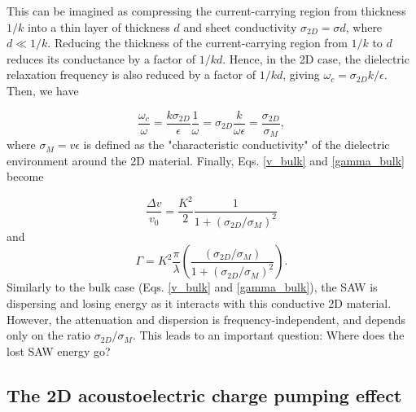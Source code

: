 \documentclass[double,12pt,1in]{beavtex}
\begin{document}
This can be imagined as compressing the current-carrying region from thickness $1/k$ into a thin layer of thickness $d$ and sheet conductivity $\sigma_{2D} = \sigma d$, where $d \ll 1/k$. Reducing the thickness of the current-carrying region from $1/k$ to $d$ reduces its conductance by a factor of $1/kd$. Hence, in the 2D case, the dielectric relaxation frequency is also reduced by a factor of $1/kd$, giving $\omega_c = \sigma_{2D}k/\epsilon$. Then, we have
 
\begin{equation}
    \frac{\omega_c}{\omega} = \frac{k\sigma_{2D}}{\epsilon}\frac{1}{\omega} = \sigma_{2D}\frac{k}{\omega \epsilon} = \frac{\sigma_{2D}}{\sigma_M}, \label{omega_c div omega}
\end{equation}
where $\sigma_M = v \epsilon$ is defined as the "characteristic conductivity" of the dielectric environment around the 2D material. Finally, Eqs. \ref{v_bulk} and \ref{gamma_bulk} become

\begin{equation}
    \frac{\Delta v}{v_0} = \frac{K^2}{2}\frac{1}{1+(\sigma_{2D}/\sigma_M)^2} \label{v_2D}
\end{equation}
and
\begin{equation}
    \Gamma = K^2 \frac{\pi}{\lambda}\left(\frac{(\sigma_{2D}/\sigma_M)}{1+(\sigma_{2D}/\sigma_M)^2}\right). \label{gamma_2D}
\end{equation}
Similarly to the bulk case (Eqs. \ref{v_bulk} and \ref{gamma_bulk}), the SAW is dispersing and losing energy as it interacts with this conductive 2D material. However, the attenuation and dispersion is frequency-independent, and depends only on the ratio $\sigma_{2D}/\sigma_M$. This leads to an important question: Where does the lost SAW energy go? 


\subsection{The 2D acoustoelectric charge pumping effect}

\end{document}
